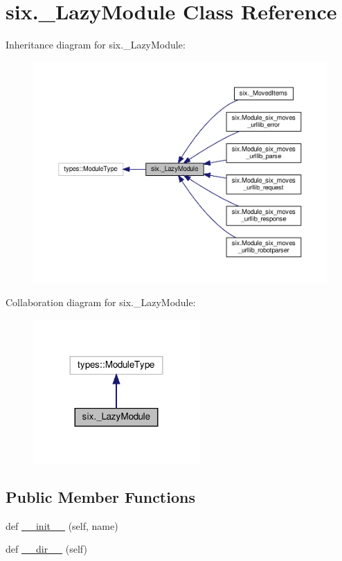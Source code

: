\hypertarget{classsix_1_1__LazyModule}{}\section{six.\+\_\+\+Lazy\+Module Class Reference}
\label{classsix_1_1__LazyModule}


Inheritance diagram for six.\+\_\+\+Lazy\+Module\+:
\nopagebreak
\begin{figure}[H]
\begin{center}
\leavevmode
\includegraphics[width=350pt]{classsix_1_1__LazyModule__inherit__graph}
\end{center}
\end{figure}


Collaboration diagram for six.\+\_\+\+Lazy\+Module\+:
\nopagebreak
\begin{figure}[H]
\begin{center}
\leavevmode
\includegraphics[width=180pt]{classsix_1_1__LazyModule__coll__graph}
\end{center}
\end{figure}
\subsection*{Public Member Functions}
\begin{DoxyCompactItemize}
\item 
def \hyperlink{classsix_1_1__LazyModule_a7c22088db3bceb8a372f3547d9ddfd53}{\+\_\+\+\_\+init\+\_\+\+\_\+} (self, name)
\item 
def \hyperlink{classsix_1_1__LazyModule_a3550253661aad92848159f3074e2e9c5}{\+\_\+\+\_\+dir\+\_\+\+\_\+} (self)
\end{DoxyCompactItemize}


